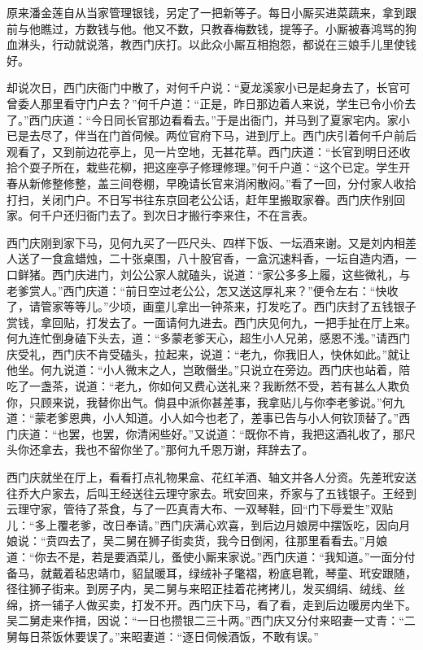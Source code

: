 原来潘金莲自从当家管理银钱，另定了一把新等子。每日小厮买进菜蔬来，拿到跟前与他瞧过，方数钱与他。他又不数，只教春梅数钱，提等子。小厮被春鸿骂的狗血淋头，行动就说落，教西门庆打。以此众小厮互相抱怨，都说在三娘手儿里使钱好。

却说次日，西门庆衙门中散了，对何千户说：“夏龙溪家小已是起身去了，长官可曾委人那里看守门户去？”何千户道：“正是，昨日那边着人来说，学生已令小价去了。”西门庆道：“今日同长官那边看看去。”于是出衙门，并马到了夏家宅内。家小已是去尽了，伴当在门首伺候。两位官府下马，进到厅上。西门庆引着何千户前后观看了，又到前边花亭上，见一片空地，无甚花草。西门庆道：“长官到明日还收拾个耍子所在，栽些花柳，把这座亭子修理修理。”何千户道：“这个已定。学生开春从新修整修整，盖三间卷棚，早晚请长官来消闲散闷。”看了一回，分付家人收拾打扫，关闭门户。不日写书往东京回老公公话，赶年里搬取家眷。西门庆作别回家。何千户还归衙门去了。到次日才搬行李来住，不在言表。

西门庆刚到家下马，见何九买了一匹尺头、四样下饭、一坛酒来谢。又是刘内相差人送了一食盒蜡烛，二十张桌围，八十股官香，一盒沉速料香，一坛自造内酒，一口鲜猪。西门庆进门，刘公公家人就磕头，说道：“家公多多上履，这些微礼，与老爹赏人。”西门庆道：“前日空过老公公，怎又送这厚礼来？”便令左右：“快收了，请管家等等儿。”少顷，画童儿拿出一钟茶来，打发吃了。西门庆封了五钱银子赏钱，拿回贴，打发去了。一面请何九进去。西门庆见何九，一把手扯在厅上来。何九连忙倒身磕下头去，道：“多蒙老爹天心，超生小人兄弟，感恩不浅。”请西门庆受礼，西门庆不肯受磕头，拉起来，说道：“老九，你我旧人，快休如此。”就让他坐。何九说道：“小人微末之人，岂敢僭坐。”只说立在旁边。西门庆也站着，陪吃了一盏茶，说道：“老九，你如何又费心送礼来？我断然不受，若有甚么人欺负你，只顾来说，我替你出气。倘县中派你甚差事，我拿贴儿与你李老爹说。”何九道：“蒙老爹恩典，小人知道。小人如今也老了，差事已告与小人何钦顶替了。”西门庆道：“也罢，也罢，你清闲些好。”又说道：“既你不肯，我把这酒礼收了，那尺头你还拿去，我也不留你坐了。”那何九千恩万谢，拜辞去了。

西门庆就坐在厅上，看看打点礼物果盒、花红羊酒、轴文并各人分资。先差玳安送往乔大户家去，后叫王经送往云理守家去。玳安回来，乔家与了五钱银子。王经到云理守家，管待了茶食，与了一匹真青大布、一双琴鞋，回“门下辱爱生”双贴儿：“多上覆老爹，改日奉请。”西门庆满心欢喜，到后边月娘房中摆饭吃，因向月娘说：“贲四去了，吴二舅在狮子街卖货，我今日倒闲，往那里看看去。”月娘道：“你去不是，若是要酒菜儿，蚤使小厮来家说。”西门庆道：“我知道。”一面分付备马，就戴着毡忠靖巾，貂鼠暖耳，绿绒补子氅褶，粉底皂靴，琴童、玳安跟随，径往狮子街来。到房子内，吴二舅与来昭正挂着花拷拷儿，发买绸绢、绒线、丝绵，挤一铺子人做买卖，打发不开。西门庆下马，看了看，走到后边暖房内坐下。吴二舅走来作揖，因说：“一日也攒银二三十两。”西门庆又分付来昭妻一丈青：“二舅每日茶饭休要误了。”来昭妻道：“逐日伺候酒饭，不敢有误。”

